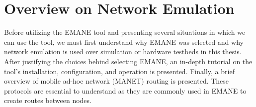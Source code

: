 \chapter{Overview on Network Emulation}
\label{chapter2}
Before utilizing the EMANE tool and presenting several situations in which we can use the tool, we must first understand why EMANE was selected and why network emulation is used over simulation or hardware testbeds in this thesis.
After justifying the choices behind selecting EMANE, an in-depth tutorial on the tool's installation, configuration, and operation is presented.
Finally, a brief overview of mobile ad-hoc network (MANET) routing is presented.
These protocols are essential to understand as they are commonly used in EMANE to create routes between nodes.\par

